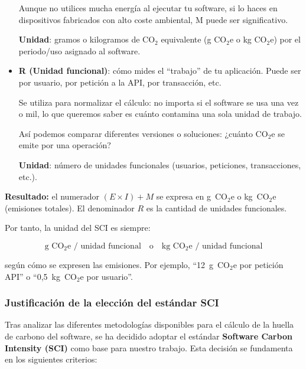 \documentclass[12pt,a4paper]{report}
\begin{document}
\begin{itemize}
        Aunque no utilices mucha energía al ejecutar tu software, si lo haces en dispositivos fabricados con alto coste ambiental, M puede ser significativo.

        \textbf{Unidad}: gramos o kilogramos de CO$_2$ equivalente (g CO$_2$e o kg CO$_2$e) por el periodo/uso asignado al software.

  \item \textbf{R (Unidad funcional)}: cómo mides el ``trabajo'' de tu aplicación. Puede ser por usuario, por petición a la API, por transacción, etc.

        Se utiliza para normalizar el cálculo: no importa si el software se usa una vez o mil, lo que queremos saber es cuánto contamina una sola unidad de trabajo.

        Así podemos comparar diferentes versiones o soluciones: ¿cuánto CO$_2$e se emite por una operación?

        \textbf{Unidad}: número de unidades funcionales (usuarios, peticiones, transacciones, etc.).
\end{itemize}

\textbf{Resultado:} el numerador $(E \times I) + M$ se expresa en g~CO$_2$e o kg~CO$_2$e (emisiones totales). El denominador $R$ es la cantidad de unidades funcionales. 

Por tanto, la unidad del SCI es siempre:

\[
\text{g~CO$_2$e / unidad funcional} 
\quad \text{o} \quad 
\text{kg~CO$_2$e / unidad funcional}
\]

según cómo se expresen las emisiones. Por ejemplo, ``12~g~CO$_2$e por petición API'' o ``0,5~kg~CO$_2$e por usuario''.

\subsubsection{Justificación de la elección del estándar SCI}

Tras analizar las diferentes metodologías disponibles para el cálculo de la huella de carbono del software, se ha decidido adoptar el estándar \textbf{Software Carbon Intensity (SCI)} como base para nuestro trabajo. Esta decisión se fundamenta en los siguientes criterios:
\end{document}
